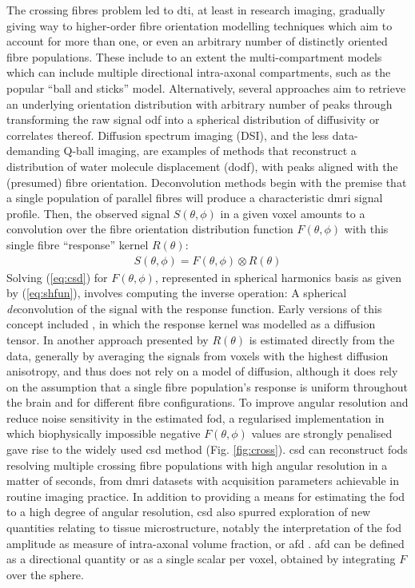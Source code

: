The crossing fibres problem led to \gls{dti}, at least in research imaging, gradually giving way to higher-order fibre orientation modelling techniques which aim to account for more than one, or even an arbitrary number of distinctly oriented fibre populations\autocite{Alexander2005}.
These include to an extent the multi-compartment models which can include multiple directional intra-axonal compartments, such as the popular ``ball and sticks'' model\autocite{Behrens2003,Behrens2007}.
Alternatively, several approaches aim to retrieve an underlying orientation distribution with arbitrary number of peaks through transforming the raw signal \gls{odf} into a spherical distribution of diffusivity or correlates thereof.
Diffusion spectrum imaging (DSI)\autocite{Wedeen2008}, and the less data-demanding Q-ball imaging\autocite{Tuch2003,Tuch2004}, are examples of methods that reconstruct a distribution of water molecule displacement (\gls{dodf}), with peaks aligned with the (presumed) fibre orientation.
Deconvolution methods begin with the premise that a single population of parallel fibres will produce a characteristic \gls{dmri} signal profile.
Then, the observed signal $S(\theta,\phi)$ in a given voxel amounts to a convolution over the fibre orientation distribution function $F(\theta,\phi)$ with this single fibre ``response'' kernel $R(\theta)$:
\begin{align}
  S(\theta,\phi) = F(\theta,\phi) \otimes R(\theta)
\end{align}\label{eq:csd}
Solving (\ref{eq:csd}) for $F(\theta,\phi)$, represented in spherical harmonics basis as given by (\ref{eq:shfun}), involves computing the inverse operation:
A spherical \textit{de}convolution of the signal with the response function.
Early versions of this concept included \textcite{Anderson2005}, in which the response kernel was modelled as a diffusion tensor.
In another approach presented by \textcite{Tournier2004} $R(\theta)$ is estimated directly from the data, generally by averaging the signals from voxels with the highest diffusion anisotropy, and thus does not rely on a model of diffusion, although it does rely on the assumption that a single fibre population's response is uniform throughout the brain and for different fibre configurations.
To improve angular resolution and reduce noise sensitivity in the estimated \gls{fod}, a regularised implementation in which biophysically impossible negative $F(\theta,\phi)$ values are strongly penalised gave rise to the widely used \gls{csd} method (Fig. \ref{fig:cross}).
\Gls{csd} can reconstruct \glspl{fod} resolving multiple crossing fibre populations with high angular resolution in a matter of seconds, from \gls{dmri} datasets with acquisition parameters achievable in routine imaging practice\autocite{Tournier2013}.
In addition to providing a means for estimating the \gls{fod} to a high degree of angular resolution, \gls{csd} also spurred exploration of new quantities relating to tissue microstructure, notably the interpretation of the \gls{fod} amplitude as measure of intra-axonal volume fraction, or \gls{afd} \autocite{Raffelt2012a}.
\Gls{afd} can be defined as a directional quantity or as a single scalar per voxel, obtained by integrating $F$ over the sphere.

